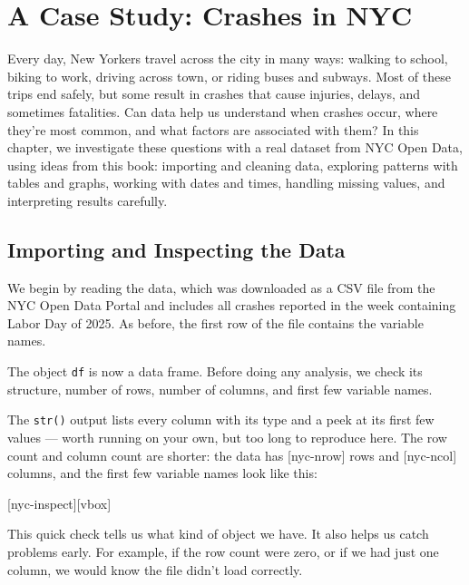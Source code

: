 \chapter{A Case Study: Crashes in NYC}
\label{ch:nyc}


Every day, New Yorkers travel across the city in many ways:
walking to school, biking to work, driving across town, or riding
buses and subways. Most of these trips end safely, but some result
in crashes that cause injuries, delays, and sometimes fatalities. Can
data help us understand when crashes occur, where they're most
common, and what factors are associated with them? In this chapter, we
investigate these questions with a real dataset from NYC Open Data,
using ideas from this book: importing and cleaning data,
exploring patterns with tables and graphs, working with dates and
times, handling missing values, and interpreting results carefully.



\section{Importing and Inspecting the Data}

We begin by reading the data, which was downloaded as a CSV
file from the NYC Open Data Portal and includes all
crashes reported in the week containing Labor Day of 2025. As before,
the first row of the file contains the variable names.


The object \lstinline{df} is now a data frame. Before
doing any analysis, we check its structure, number of rows, number of
columns, and first few variable names.


The \lstinline{str()} output lists every column with its type and a
peek at its first few values --- worth running on your own, but too
long to reproduce here. The row count and column count are shorter: the
data has [nyc-nrow] rows and
[nyc-ncol] columns, and the first few variable
names look like this:

[nyc-inspect][vbox]

This quick check tells us what kind of object we have. It also helps us
catch problems early. For example, if the row count were zero, or if
we had just one column, we would know the file didn't load correctly.


